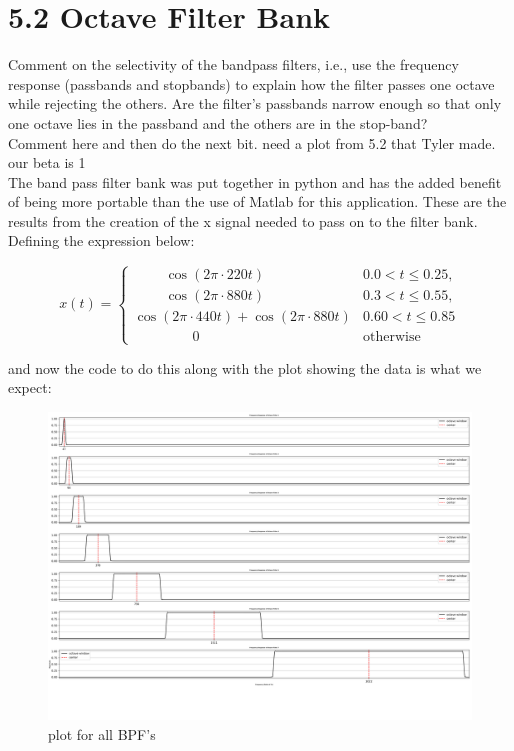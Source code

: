 \documentclass[a4paper, 11pt]{exam}
\begin{document}
\section*{5.2 Octave Filter Bank}
 Comment on the selectivity of the bandpass filters, i.e., use the frequency response (passbands and stopbands) to explain how the filter passes one octave while rejecting the others. Are the filter’s passbands narrow enough so that only one octave lies in the passband and the others are in
 the stop-band?
\\ Comment here and then do the next bit. need a plot from 5.2 that Tyler made. our beta is 1\\
The band pass filter bank was put together in python and has the added benefit of being more portable than the use of Matlab for this application. These are the results from the creation of the x signal needed to pass on to the filter bank. Defining the expression below:
\begin{center}
  \[
    x(t) =
    \begin{cases}
      \ \ \ \ \ \ \ \ \ \ \cos{(2\pi\cdot 220 t)} & 0.0 < t \le 0.25 , \\
      \ \ \ \ \ \ \ \ \ \ \cos{(2\pi\cdot 880 t)} & 0.3 < t \le 0.55 , \\
      \cos{(2\pi\cdot 440 t)} + \cos{(2\pi\cdot 880 t)} & 0.60 < t \le 0.85\\
      \ \ \ \ \ \ \ \ \ \ \ \ \ \ \ \ \ \ \ 0\ \ & \text{otherwise}
    \end{cases}
    \]
\end{center}
\newpage
and now the code to do this along with the plot showing the data is what we expect:\\  
\begin{figure}[h!]
  \centering
  \hspace*{-1.5cm}\includegraphics[width=18cm]{../images/freq_data.png}
  \caption{plot for all BPF's}
  \label{fig:bandpass}
\end{figure}
\end{document}
